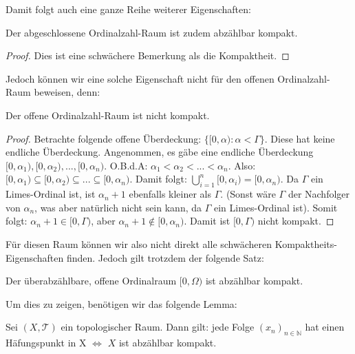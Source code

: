 \documentclass[11pt]{scrartcl}
\begin{document}
Damit folgt auch eine ganze Reihe weiterer Eigenschaften:
\begin{corollary}
	Der abgeschlossene Ordinalzahl-Raum ist zudem abzählbar kompakt.
\end{corollary}
\begin{proof}
	Dies ist eine schwächere Bemerkung als die Kompaktheit.
\end{proof}
Jedoch können wir eine solche Eigenschaft nicht für den offenen Ordinalzahl-Raum beweisen, denn:
\begin{theorem}
	Der offene Ordinalzahl-Raum ist nicht kompakt.
\end{theorem}
\begin{proof}
	Betrachte folgende offene Überdeckung: $\{[0,\alpha): \alpha <\Gamma\}$. Diese hat keine endliche Überdeckung.
	Angenommen, es gäbe eine endliche Überdeckung $[0,\alpha_1),[0,\alpha_2),...,[0,\alpha_n)$. O.B.d.A: $\alpha_1 <\alpha_2 < ... < \alpha_n$. Also: $[0,\alpha_1)\subseteq [0,\alpha_2)\subseteq ... \subseteq [0,\alpha_n)$.
	Damit folgt: $\bigcup_{i=1}^n [0,\alpha_i)=[0,\alpha_n)$. Da $\Gamma$ ein Limes-Ordinal ist, 
	ist $\alpha_n+1$ ebenfalls kleiner als $\Gamma$. (Sonst wäre $\Gamma$ der Nachfolger von $\alpha_n$, was aber natürlich nicht sein kann, da $\Gamma$ ein Limes-Ordinal ist).
	Somit folgt: $\alpha_n+1 \in [0, \Gamma)$, aber $\alpha_n+1\notin [0,\alpha_n)$. Damit ist $[0,\Gamma)$ nicht kompakt.
\end{proof}
Für diesen Raum können wir also nicht direkt alle schwächeren Kompaktheits-Eigenschaften finden. Jedoch gilt trotzdem der folgende Satz:
\begin{theorem}
	Der überabzählbare, offene Ordinalraum $[0,\Omega)$ ist abzählbar kompakt.
\end{theorem}
Um dies zu zeigen, benötigen wir das folgende Lemma:
\begin{lemma}
	Sei $(X,\mathcal T)$ ein topologischer Raum. Dann gilt: jede Folge $(x_n)_{n\in\mathbb N}$ hat einen Häfungspunkt in X $\iff$ $X$ ist abzählbar kompakt.
\end{lemma}
\end{document}
